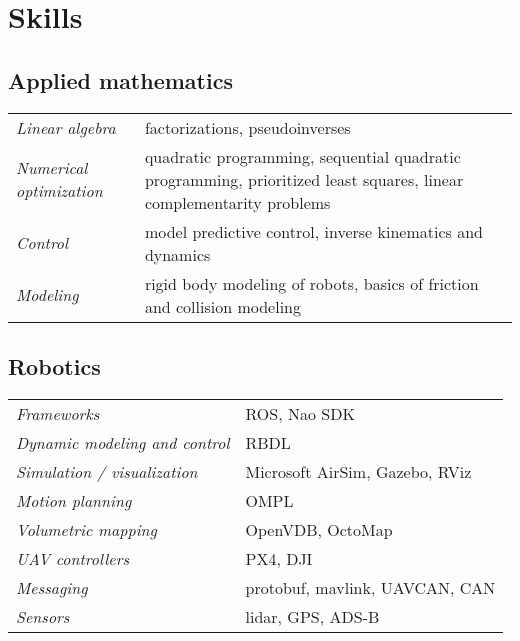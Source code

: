 \documentclass[a4paper,10pt]{report}
\begin{document}
\vspace{0.2cm}
\section{Skills}
\begin{adjustwidth}{0.5cm}{0pt}
%
\subsection{Applied mathematics}
\begin{adjustwidth}{0.5cm}{0pt}
    \begin{tabularx}{\linewidth}{l X}
        {\it Linear algebra}            &   factorizations, pseudoinverses \\
        {\it Numerical optimization}    &   quadratic programming, sequential quadratic programming,
                                            prioritized least squares, linear complementarity problems \\
        {\it Control}                   &   model predictive control, inverse kinematics and dynamics \\
        {\it Modeling}                  &   rigid body modeling of robots, basics of friction and
                                            collision modeling
    \end{tabularx}
\end{adjustwidth}

\vspace{0.2cm}
\subsection{Robotics}
\begin{adjustwidth}{0.5cm}{0pt}
    \begin{tabularx}{\linewidth}{l X}
        {\it Frameworks}                    & ROS, Nao SDK \\
        {\it Dynamic modeling and control}  & RBDL \\
        {\it Simulation / visualization}    & Microsoft AirSim, Gazebo, RViz \\
        {\it Motion planning}               & OMPL \\
        {\it Volumetric mapping}            & OpenVDB, OctoMap \\
        {\it UAV controllers}               & PX4, DJI \\
        {\it Messaging}                     & protobuf, mavlink, UAVCAN, CAN \\
        {\it Sensors}                       & lidar, GPS, ADS-B
    \end{tabularx}
\end{adjustwidth}


\end{adjustwidth}
\end{document}
